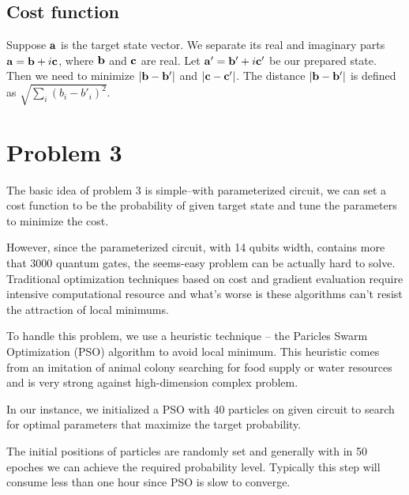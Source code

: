 \documentclass[a4paper, 11pt]{article}
\numberwithin{equation}{section}
\theoremstyle{definition}
\begin{document}
\subsection{Cost function}

Suppose $\vb{a}$ is the target state vector. We separate its real and imaginary parts $\vb{a} = \vb{b} + i\vb{c}$, where $\vb{b}$ and $\vb{c}$ are real. Let $\vb{a}' = \vb{b}' + i\vb{c}'$ be our prepared state. Then we need to minimize $|\vb{b} - \vb{b}'|$ and $|\vb{c} - \vb{c}'|$. The distance $|\vb{b} - \vb{b}'|$ is defined as $\sqrt{\sum_i (b_i - b'_i)^2}$.




\section{Problem 3}

The basic idea of problem 3 is simple--with parameterized circuit, we can set a cost function to be the probability of given target state and tune the parameters to minimize the cost.

However, since the parameterized circuit, with 14 qubits width, contains more that 3000 quantum gates, the seems-easy problem can be actually hard to solve. Traditional optimization techniques based on cost and gradient evaluation require intensive computational resource and what's worse is these algorithms can't resist the attraction of local minimums. 
  

To handle this problem, we use a heuristic technique -- the Paricles Swarm Optimization (PSO) algorithm to avoid local minimum. This heuristic comes from an imitation of animal colony searching for food supply or water resources and is very strong against high-dimension complex problem.


In our instance, we initialized a PSO with 40 particles on given circuit to search for optimal parameters that maximize the target probability. 

The initial positions of particles are randomly set and generally with in 50 epoches we can achieve the required probability level. Typically this step will consume less than one hour since PSO is slow to converge.





% 


\end{document}
